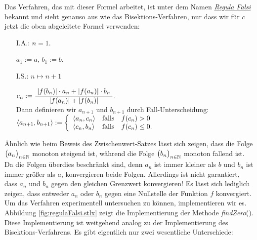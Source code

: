 Das Verfahren, das mit dieser Formel arbeitet, ist unter dem Namen 
\href{http://de.wikipedia.org/wiki/Regula_falsi}{\emph{Regula Falsi}}
bekannt und sieht genauso aus wie das Bisektions-Verfahren, nur dass wir f\"ur $c$ jetzt
die oben abgeleitete Formel verwenden:
\begin{enumerate}
\item[I.A.:] $n=1$.

      $a_1 := a$, \quad $b_1 := b$.
\item[I.S.:] $n \mapsto n+1$

      \hspace*{1.3cm} $c_n := \displaystyle\frac{\;\displaystyle|f(b_n)|\cdot a_n + |f(a_n)|\cdot b_n\;}{\;\displaystyle|f(a_n)| + |f(b_n)|\;}$. \\[0.3cm]
      Dann definieren wir $a_{n+1}$ und $b_{n+1}$ durch Fall-Unterscheidung:
      \\[0.2cm]
      \hspace*{1.3cm}
      $\pair(a_{n+1},b_{n+1}) := 
         \left\{ \begin{array}{ll}
                 \pair(a_n,c_n) & \mbox{falls}\quad f(c_n) >    0 \\
                 \pair(c_n,b_n) & \mbox{falls}\quad f(c_n) \leq 0. \\
                 \end{array}
         \right.
      $
\end{enumerate}
\"Ahnlich wie beim Beweis des Zwischenwert-Satzes l\"asst sich zeigen, dass die Folge
$\bigl(a_n\bigr)_{n\in\mathbb{N}}$ monoton steigend ist, w\"ahrend die Folge $\bigl(b_n\bigr)_{n\in\mathbb{N}}$ monoton fallend ist.
Da die Folgen \"uberdies beschr\"ankt sind, denn $a_n$ ist immer kleiner als $b$ und $b_n$ ist
immer gr\"o{\ss}er als $a$, konvergieren beide Folgen.  Allerdings ist nicht garantiert, dass
$a_n$ und $b_n$ gegen den gleichen Grenzwert konvergieren!  Es l\"asst sich lediglich zeigen,
dass entweder $a_n$ oder $b_n$ gegen eine Nullstelle der Funktion $f$ konvergiert.
Um das Verfahren experimentell untersuchen zu k\"onnen, implementieren wir es.
Abbildung \ref{fig:regulaFalsi.stlx} zeigt die Implementierung der Methode
\textsl{findZero}().   Diese Implementierung ist weitgehend analog zu der Implementierung des
Bisektions-Verfahrens.  Es gibt eigentlich nur zwei wesentliche Unterschiede:
